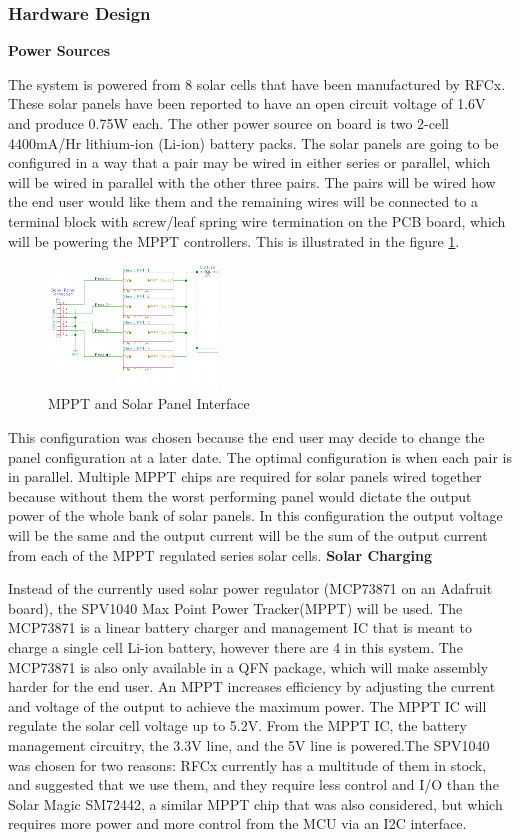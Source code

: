 \documentclass{article}
\begin{document}
{\subsubsection{Hardware Design}

\textbf{Power Sources}

The system is powered from 8 solar cells that have been manufactured by RFCx. These solar panels have been reported to have an open circuit voltage of 1.6V and produce 0.75W each. The other power source on board is two 2-cell 4400mA/Hr lithium-ion (Li-ion) battery packs. The solar panels are going to be configured in a way that a pair may be wired in either series or parallel, which will be wired in parallel with the other three pairs. The pairs will be wired how the end user would like them and the remaining wires will be connected to a terminal block with screw/leaf spring wire termination on the PCB board, which will be powering the MPPT controllers. This is illustrated in the figure \ref{fig:mpptsol}. 

\begin{figure}[H]
	\centering
	\includegraphics[width=0.4\textwidth]{MPPTblocks}
	\caption{MPPT and Solar Panel Interface}
	\label{fig:mpptsol}
\end{figure}

This configuration was chosen because the end user may decide to change the panel configuration at a later date. The optimal configuration is when each pair is in parallel. Multiple MPPT chips are required for solar panels wired together because without them the worst performing panel would dictate the output power of the whole bank of solar panels. In this configuration the output voltage will be the same and the output current will be the sum of the output current from each of the MPPT regulated series solar cells. 
\textbf{Solar Charging}

Instead of the currently used solar power regulator (MCP73871 on an Adafruit board), the SPV1040 Max Point Power Tracker(MPPT) will be used. The MCP73871 is a linear battery charger and management IC that is meant to charge a single cell Li-ion battery, however there are 4 in this system. The MCP73871 is also only available in a QFN package, which will make assembly harder for the end user. An MPPT increases efficiency by adjusting the current and voltage of the output to achieve the maximum power. The MPPT IC will regulate the solar cell voltage up to 5.2V. From the MPPT IC, the battery management circuitry, the 3.3V line, and the 5V line is powered.The SPV1040 was chosen for two reasons: RFCx currently has a multitude of them in stock, and suggested that we use them, and they require less control and I/O than the Solar Magic SM72442, a similar MPPT chip that was also considered, but which requires more power and more control from the MCU via an I2C interface.

}
\end{document}
